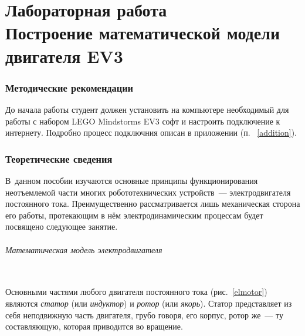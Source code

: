 \documentclass[12pt,a4paper,openany]{extarticle}
\begin{document}
\part*{Лабораторная работа \\
Построение математической модели двигателя EV3}

\section{Методические рекомендации}
\hspace*{\parindent}До начала работы студент должен установить на компьютере необходимый для работы с набором LEGO Mindstorms EV3 софт и настроить подключение к интернету.
Подробно процесс подключния описан в приложении (п. ~\ref{addition}). 

\section{Теоретические сведения}
\hspace*{\parindent}В~данном пособии изучаются основные принципы функционирования неотъемлемой части многих робототехнических устройств~--- электродвигателя постоянного тока.
Преимущественно рассматривается лишь механическая сторона его работы, протекающим в нём электродинамическим процессам будет посвящено следующее занятие. 

\paragraph*{Математическая модель электродвигателя}$\phantom{-}$\\
\hspace*{\parindent}Основными частями любого двигателя постоянного тока (рис.~\ref{elmotor}) являются {\itshape статор} (или \textit{индуктор})  и {\itshape ротор} (или \textit{якорь}).
Статор представляет из себя неподвижную часть двигателя, грубо говоря, его корпус,
ротор же~--- ту составляющую, которая приводится во вращение. 
\end{document}
